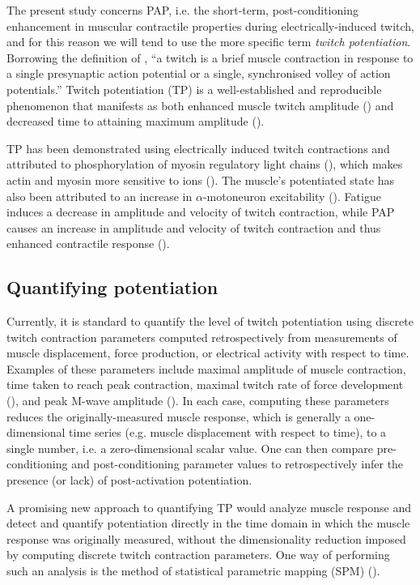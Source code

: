 \documentclass[utf8]{FrontiersinHarvard}
\begin{document}
The present study concerns PAP, i.e. the short-term, post-conditioning enhancement in muscular contractile properties during electrically-induced twitch, and for this reason we will tend to use the more specific term \textit{twitch potentiation}.
Borrowing the definition of \cite{hodgson},
``a twitch is a brief muscle contraction in response to a single presynaptic action potential or a single, synchronised volley of action potentials.''
Twitch potentiation (TP) is a well-established and reproducible phenomenon that manifests as both enhanced muscle twitch amplitude (\cite{gossen, hamada, vandervoort}) and decreased time to attaining maximum amplitude (\cite{sasaki, sale, grange}).

TP has been demonstrated using electrically induced twitch contractions and attributed to phosphorylation of myosin regulatory light chains (\cite{grange}), which makes actin and myosin more sensitive to  ions (\cite{hodgson}).
The muscle's potentiated state has also been attributed to an increase in $ \alpha $-motoneuron excitability (\cite{mccann}).
Fatigue induces a decrease in amplitude and velocity of twitch contraction, while PAP causes an increase in amplitude and velocity of twitch contraction and thus enhanced contractile response (\cite{hodgson, rodriguez-falces, sasaki}).

\subsection{Quantifying potentiation}
Currently, it is standard to quantify the level of twitch potentiation using discrete twitch contraction parameters computed retrospectively from measurements of muscle displacement, force production, or electrical activity with respect to time.
Examples of these parameters include maximal amplitude of muscle contraction, time taken to reach peak contraction, maximal twitch rate of force development (\cite{cochrane, kuu, wallace}), and peak M-wave amplitude (\cite{rodriguez-falces}).
In each case, computing these parameters reduces the originally-measured muscle response, which is generally a one-dimensional time series (e.g. muscle displacement with respect to time), to a single number, i.e. a zero-dimensional scalar value.
One can then compare pre-conditioning and post-conditioning parameter values to retrospectively infer the presence (or lack) of post-activation potentiation.

A promising new approach to quantifying TP would analyze 
muscle response and detect and quantify potentiation directly in the time domain in which the muscle response was originally measured, without the dimensionality reduction imposed by computing discrete twitch contraction parameters.
One way of performing such an analysis is the method of statistical parametric mapping (SPM) (\cite{friston, pataky-spm1d, pataky-roi, pataky}).
\end{document}
